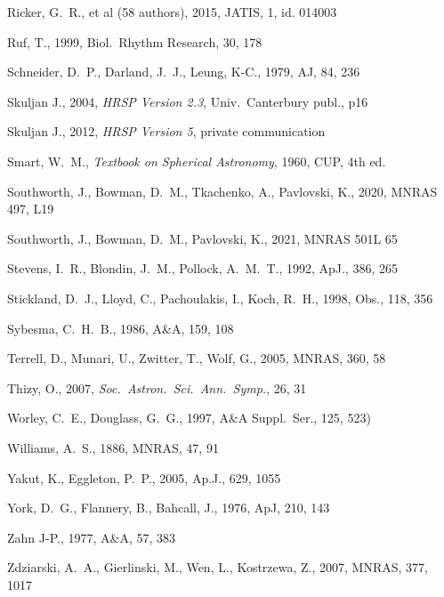 \documentclass[useAMS,usenatbib]{mnras}                                                                           \usepackage[pdftex]{graphicx}
\begin{document}
\begin{thebibliography}{}
Ricker, G.\ R., et al (58 authors), 2015,
JATIS, 1, id. 014003

Ruf, T., 1999, Biol.\ Rhythm Research, 30, 178

Schneider, D.\ P., Darland, J.\ J., Leung, K-C., 1979, AJ, 84, 236

Skuljan J., 2004, {\em HRSP Version 2.3}, Univ.\ Canterbury publ., p16

Skuljan J., 2012,  {\em HRSP Version 5}, private communication

Smart, W.\ M., {\em Textbook on Spherical Astronomy}, 1960,
CUP, 4th ed.

Southworth, J., Bowman, D.\ M., Tkachenko, A.,  Pavlovski, K., 2020,
MNRAS 497, L19

Southworth, J., Bowman, D.\ M., Pavlovski, K., 2021, MNRAS 501L 65

Stevens, I.\ R., Blondin, J.\ M., Pollock, A.\ M.\ T.,  1992,  ApJ., 386, 265

Stickland, D.\ J., Lloyd, C., Pachoulakis, I., Koch, R.\ H., 1998, 
 Obs., 118, 356

Sybesma, C.\ H.\ B., 1986, A\&A, 159, 108
 
Terrell, D., Munari, U., Zwitter, T., Wolf, G., 2005, MNRAS, 360, 58

Thizy, O., 2007, {\em Soc.\ Astron.\ Sci.\ Ann.\ Symp.}, 26,  31

Worley, C.\ E., Douglass, G.\ G., 1997,
 	A{\&}A Suppl.\ Ser., 125, 523)

Williams, A.\ S., 1886, MNRAS, 47, 91
 
Yakut, K., Eggleton, P.\ P., 2005, Ap.J., 629, 1055


York, D.\ G., Flannery, B.,  Bahcall, J., 1976, ApJ, 210, 143

Zahn J-P., 1977, A{\&}A, 57, 383
 
Zdziarski, A.\ A., Gierlinski, M., Wen, L., Kostrzewa, Z., 2007, MNRAS, 377, 1017

\end{thebibliography}{}

 
\end{document}

